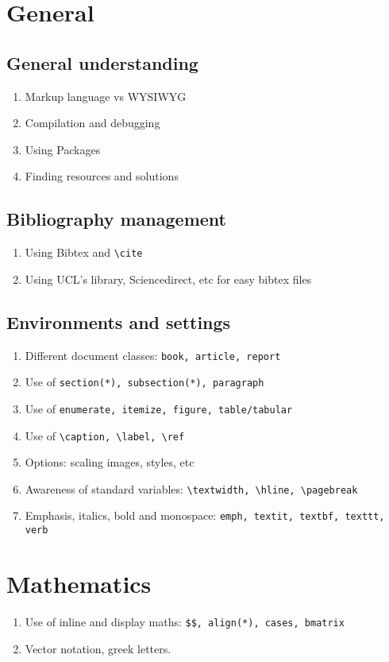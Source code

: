 \chapter{General}
\section{General understanding}
    \begin{enumerate}
        \item Markup language vs WYSIWYG
        \item Compilation and debugging
        \item Using Packages
        \item Finding resources and solutions
    \end{enumerate}
\section{Bibliography management}
    \begin{enumerate}
        \item Using Bibtex and \verb|\cite|
        \item Using UCL's library, Sciencedirect, etc for easy bibtex files
    \end{enumerate}
\section{Environments and settings} 
    \begin{enumerate}
        \item Different document classes: \verb|book, article, report|
        \item Use of \verb|section(*), subsection(*), paragraph|
        \item Use of \verb|enumerate, itemize, figure, table/tabular|
        \item Use of \verb|\caption, \label, \ref|
        \item Options: scaling images, styles, etc
        \item Awareness of standard variables: \verb|\textwidth, \hline, \pagebreak|
        \item Emphasis, italics, bold and monospace: \texttt{emph, textit, textbf, texttt, verb}
    \end{enumerate}

\chapter{Mathematics}
    \begin{enumerate}
        \item Use of inline and display maths: \verb|$$, align(*), cases, bmatrix|
        \item Vector notation, greek letters.
    \end{enumerate}
